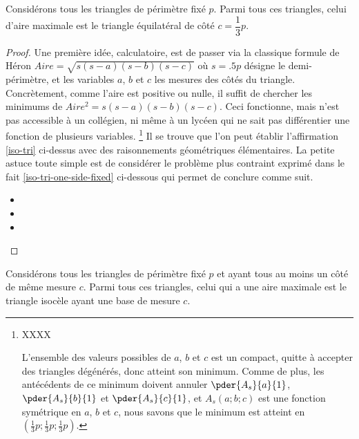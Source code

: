 \begin{fact}\label{iso-tri}
	Considérons tous les triangles de périmètre fixé $p$. Parmi tous ces triangles, celui d'aire maximale est le triangle équilatéral de côté $c = \dfrac13 p$.
\end{fact}


\begin{proof}
	Une première idée, calculatoire, est de passer via la classique formule de Héron $Aire = \sqrt{s(s - a)(s - b)(s - c)}$ où $s = \num{.5} p$ désigne le demi-périmètre, et les variables $a$, $b$ et $c$ les mesures des côtés du triangle. Concrètement, comme l'aire est positive ou nulle, il suffit de chercher les minimums de $Aire^2 = s(s - a)(s - b)(s - c)$. Ceci fonctionne, mais n'est pas accessible à un collégien, ni même à un lycéen qui ne sait pas différentier une fonction de plusieurs variables.%
	\footnote{
		XXXX
		
		L'ensemble des valeurs possibles de $a$, $b$ et $c$ est un compact, quitte à accepter des triangles dégénérés, donc  atteint son minimum.
		Comme de plus, les antécédents de ce minimum doivent annuler $\pder{A_s}{a}{1}$, $\pder{A_s}{b}{1}$ et $\pder{A_s}{c}{1}$, et $A_s(a;b;c)$ est une fonction symétrique en $a$, $b$ et $c$, nous savons que le minimum est atteint en $(\frac13 p ; \frac13 p ; \frac13 p)$. 
	}
	Il se trouve que l'on peut établir l'affirmation \ref{iso-tri} ci-dessus avec des raisonnements géométriques élémentaires.
	La petite astuce toute simple est de considérer le problème plus contraint exprimé dans le fait \ref{iso-tri-one-side-fixed} ci-dessous qui permet de conclure comme suit.
	\begin{itemize}
		\item 

		\item 

		\item 
	\end{itemize}
\end{proof}




\begin{fact}\label{iso-tri-one-side-fixed}
	Considérons tous les triangles de périmètre fixé $p$ et ayant tous au moins un côté de même mesure $c$. Parmi tous ces triangles, celui qui a une aire maximale est le triangle isocèle ayant une base de mesure $c$.
\end{fact}


